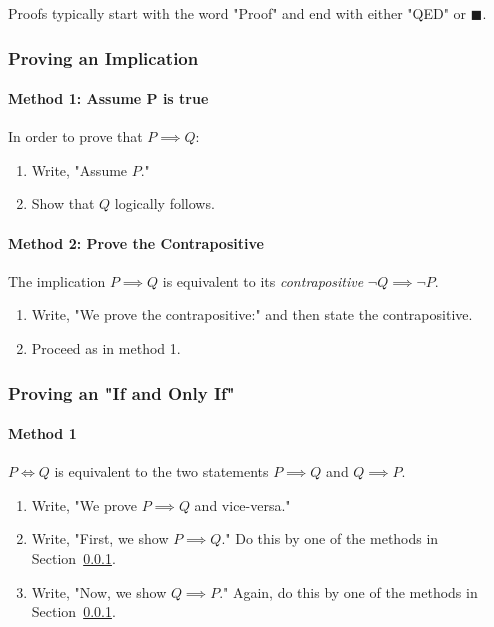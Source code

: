 \documentclass[../main.tex]{subfiles}
\begin{document}
Proofs typically start with the word "Proof" and end with either "QED" or $\blacksquare$.

\subsubsection{Proving an Implication}
\label{sec:prove_implication}

\paragraph{Method 1: Assume P is true}

In order to prove that $P \implies Q$:

\begin{enumerate}
  \item Write, "Assume $P$."
  \item Show that $Q$ logically follows.
\end{enumerate}

\paragraph{Method 2: Prove the Contrapositive}
The implication $P \implies Q$ is equivalent to its \textit{contrapositive} $\neg Q \implies \neg P$.

\begin{enumerate}
  \item Write, "We prove the contrapositive:" and then state the contrapositive.
  \item Proceed as in method 1.
\end{enumerate}

\subsubsection{Proving an "If and Only If"}

\paragraph{Method 1}

$P \iff Q$ is equivalent to the two statements $P \implies Q$ and $Q \implies P$.

\begin{enumerate}
  \item Write, "We prove $P \implies Q$ and vice-versa."
  \item Write, "First, we show $P \implies Q$." Do this by one of the methods in Section~\ref{sec:prove_implication}.
  \item Write, "Now, we show $Q \implies P$." Again, do this by one of the methods in Section~\ref{sec:prove_implication}.
\end{enumerate}
\end{document}
